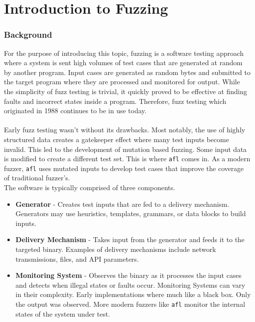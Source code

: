 \chapter{Introduction to Fuzzing}
\subsection{Background}
For the purpose of introducing this topic, fuzzing is a software testing approach where a system is sent high volumes of test cases that are generated at random by another program. Input cases are generated as random bytes and submitted to the target program where they are processed and monitored for output. While the simplicity of fuzz testing is trivial, it quickly proved to be effective at finding faults and incorrect states inside a program. Therefore, fuzz testing which originated in 1988 continues to be in use today.
\\
\\
Early fuzz testing wasn't without its drawbacks. Most notably, the use of highly structured data creates a gatekeeper effect where many test inputs become invalid. This led to the development of mutation based fuzzing. Some input data is modified to create a different test set. This is where \texttt{afl} comes in. As a modern fuzzer, \texttt{afl} uses mutated inputs to develop test cases that improve the coverage of traditional fuzzer's. 
\\

The software is typically comprised of three components. 
\begin{itemize}
\item \textbf{Generator} - Creates test inputs that are fed to a delivery mechanism. Generators may use heuristics, templates, grammars, or data blocks to build inputs. 

\item \textbf{Delivery Mechanism} - Takes input from the generator and feeds it to the targeted binary. Examples of delivery mechanisms include network transmissions, files, and API parameters.

\item \textbf{Monitoring System} - Observes the binary as it processes the input cases and detects when illegal states or faults occur. Monitoring Systems can vary in their complexity. Early implementations where much like a black box. Only the output was observed. More modern fuzzers like \texttt{afl} monitor the internal states of the system under test.
\end{itemize}


